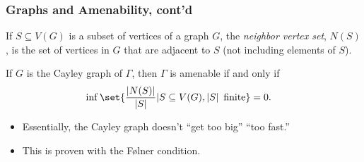 \documentclass{beamer-custom}
\begin{document}
\begin{frame}
  \frametitle{Graphs and Amenability, cont'd}
  If $S\subseteq V(G)$ is a subset of vertices of a graph $G$, the \textit{neighbor vertex set}, $N(S)$, is the set of vertices in $G$ that are adjacent to $S$ (not including elements of $S$).\pause\newline

  If $G$ is the Cayley graph of $\Gamma$, then $\Gamma$ is amenable if and only if
  \begin{align*}
    \inf\set{\frac{\left\vert N(S) \right\vert}{\left\vert S \right\vert} | S\subseteq V(G),\left\vert S \right\vert\text{ finite}} &= 0.
  \end{align*}\pause
  \begin{itemize}
    \item Essentially, the Cayley graph doesn't ``get too big'' ``too fast.''\pause
    \item This is proven with the Følner condition.
  \end{itemize}
\end{frame}
\end{document}
